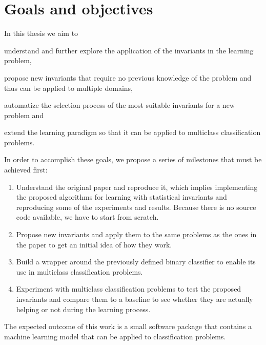 \section{Goals and objectives}

In this thesis we aim to
\begin{enumerate*}[label=(\roman*)]
    \item understand and further explore the application of the invariants in the learning
    problem,
    \item propose new invariants that require no previous knowledge of the problem and
    thus can be applied to multiple domains,
    \item automatize the selection process of the most suitable invariants for a new problem and
    \item extend the learning paradigm so that it can be applied to multiclass classification problems.
\end{enumerate*}

In order to accomplish these goals, we propose a series of milestones that must be achieved
first:

\begin{enumerate}
    \item Understand the original paper and reproduce it, which implies implementing the proposed
    algorithms for learning with statistical invariants and reproducing some of the experiments
    and results. Because there is no source code available, we have to start from scratch.
    \item Propose new invariants and apply them to the same problems as the ones in the paper
    to get an initial idea of how they work.
    \item Build a wrapper around the previously defined binary classifier to enable its use
    in multiclass classification problems.
    \item Experiment with multiclass classification problems to test the proposed invariants and
    compare them to a baseline to see whether they are actually helping or not during the learning
    process.
\end{enumerate}

The expected outcome of this work is a small software package that contains a machine learning
model that can be applied to classification problems.



